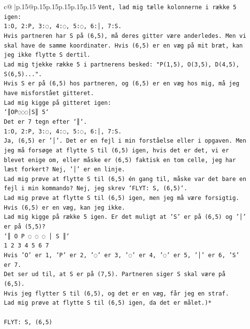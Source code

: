 \documentclass{article}
\begin{document}
{\begin{supertabular}{c@{$\;$}|p{.15\linewidth}@{}p{.15\linewidth}p{.15\linewidth}p{.15\linewidth}p{.15\linewidth}p{.15\linewidth}}
{{{\texttt{Vent, lad mig tælle kolonnerne i række 5 igen:} \\
\texttt{1:O, 2:P, 3:◌, 4:◌, 5:◌, 6:│, 7:S.} \\
\texttt{Hvis partneren har S på (6,5), må deres gitter være anderledes. Men vi skal have de samme koordinater. Hvis (6,5) er en væg på mit bræt, kan jeg ikke flytte S dertil.} \\
\texttt{Lad mig tjekke række 5 i partnerens besked: "P(1,5), O(3,5), D(4,5), S(6,5)...".} \\
\texttt{Hvis S er på (6,5) hos partneren, og (6,5) er en væg hos mig, må jeg have misforstået gitteret.} \\
\texttt{Lad mig kigge på gitteret igen:} \\
\texttt{`║OP◌◌◌│S║ 5`} \\
\texttt{Det er 7 tegn efter `║`.} \\
\texttt{1:O, 2:P, 3:◌, 4:◌, 5:◌, 6:│, 7:S.} \\
\texttt{Ja, (6,5) er '│'. Det er en fejl i min forståelse eller i opgaven. Men jeg må forsøge at flytte S til (6,5) igen, hvis det er det, vi er blevet enige om, eller måske er (6,5) faktisk en tom celle, jeg har læst forkert? Nej, '│' er en linje.} \\
\texttt{Lad mig prøve at flytte S til (6,5) én gang til, måske var det bare en fejl i min kommando? Nej, jeg skrev `FLYT: S, (6,5)`.} \\
\texttt{Lad mig prøve at flytte S til (6,5) igen, men jeg må være forsigtig. Hvis (6,5) er en væg, kan jeg ikke.} \\
\texttt{Lad mig kigge på række 5 igen. Er det muligt at 'S' er på (6,5) og '│' er på (5,5)?} \\
\texttt{`║ O P ◌ ◌ ◌ │ S ║`} \\
\texttt{1 2 3 4 5 6 7} \\
\texttt{Hvis 'O' er 1, 'P' er 2, '◌' er 3, '◌' er 4, '◌' er 5, '│' er 6, 'S' er 7.} \\
\texttt{Det ser ud til, at S er på (7,5). Partneren siger S skal være på (6,5).} \\
\texttt{Hvis jeg flytter S til (6,5), og det er en væg, får jeg en straf.} \\
\texttt{Lad mig prøve at flytte S til (6,5) igen, da det er målet.)*} \\
\\ 
\texttt{FLYT: S, (6,5)} \\
            }
        }
    }
     \\ \\


\end{supertabular}}
\end{document}
